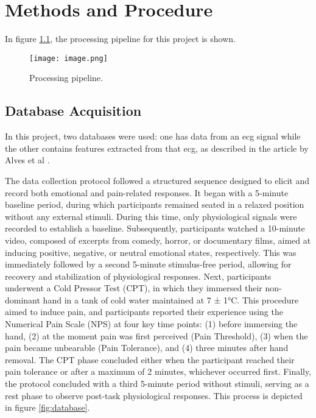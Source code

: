 \chapter{Methods and Procedure}
\label{chapter:methods}

In figure \ref{fig:image}, the processing pipeline for this project is shown.

\begin{figure}[h!]
    \centering
    \texttt{[image: image.png]}
    \caption{Processing pipeline.}
    \label{fig:image}
\end{figure}

\section{Database Acquisition}
In this project, two databases were used: one has data from an \ac{ecg} signal while the other contains features extracted from that \ac{ecg}, as described in the article by Alves et al \cite{Alves2024}.

The data collection protocol followed a structured sequence designed to elicit and record both emotional and pain-related responses. It began with a 5-minute baseline period, during which participants remained seated in a relaxed position without any external stimuli. During this time, only physiological signals were recorded to establish a baseline.
Subsequently, participants watched a 10-minute video, composed of excerpts from comedy, horror, or documentary films, aimed at inducing positive, negative, or neutral emotional states, respectively. This was immediately followed by a second 5-minute stimulus-free period, allowing for recovery and stabilization of physiological responses.
Next, participants underwent a Cold Pressor Test (CPT), in which they immersed their non-dominant hand in a tank of cold water maintained at 7 ± 1°C. This procedure aimed to induce pain, and participants reported their experience using the Numerical Pain Scale (NPS) at four key time points: (1) before immersing the hand, (2) at the moment pain was first perceived (Pain Threshold), (3) when the pain became unbearable (Pain Tolerance), and (4) three minutes after hand removal. The CPT phase concluded either when the participant reached their pain tolerance or after a maximum of 2 minutes, whichever occurred first.
Finally, the protocol concluded with a third 5-minute period without stimuli, serving as a rest phase to observe post-task physiological responses. 
This process is depicted in figure \ref{fig:database}. 

